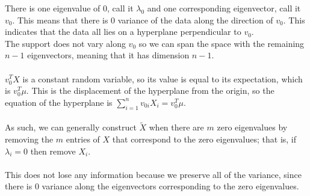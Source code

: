 \begin{Parts}
\begin{solution}
There is one eigenvalue of 0, call it $\lambda_0$ and one corresponding eigenvector, call it $v_0$. This means that there is 0 variance of the data along the direction of $v_0$. This indicates that the data all lies on a hyperplane perpendicular to $v_0$.  \\ 

The support does not vary along $v_0$ so we can span the space with the remaining $n - 1$ eigenvectors, meaning that it has dimension $n - 1$. \\ \\
 $v_0^TX$ is a constant random variable, so its value is equal to its expectation, which is $v_0^T \mu$. This is the displacement of the hyperplane from the origin, so the equation of the hyperplane is $\sum\limits_{i = 1}^n v_{0i} X_i = v_0^T\mu$. \\ \\
 As such, we can generally construct $\tilde X$ when there are $m$ zero eigenvalues by removing the $m$ entries of $X$ that correspond to the zero eigenvalues; that is, if $\lambda_i = 0$ then remove $X_i$. \\ \\
 This does not lose any information because we preserve all of the variance, since there is 0 variance along the eigenvectors corresponding to the zero eigenvalues. 

\end{solution}

\end{Parts}
